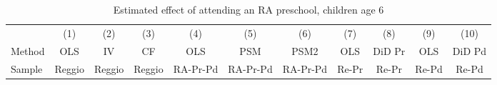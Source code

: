 \documentclass[12pt]{article}
\begin{document}
\begin{table}[ht]
\caption{Estimated effect of attending an RA preschool, children age 6}
\label{tab:childPS}
\begin{center}
\begin{adjustbox}{width=1.2\textwidth,center=\textwidth}
\small
\begin{tabular}{l*{10}{c}}
\hline\hline
& (1) & (2) & (3) & (4) & (5) & (6) & (7) & (8) & (9) & (10) \\ 
Method & OLS & IV & CF & OLS & PSM & PSM2 & OLS & DiD Pr & OLS & DiD Pd \\
Sample & Reggio & Reggio & Reggio & RA-Pr-Pd & RA-Pr-Pd & RA-Pr-Pd & Re-Pr & Re-Pr & Re-Pd & Re-Pd \\
\hline


\end{tabular}
\end{adjustbox}
\end{center}
\end{table}
\end{document}

